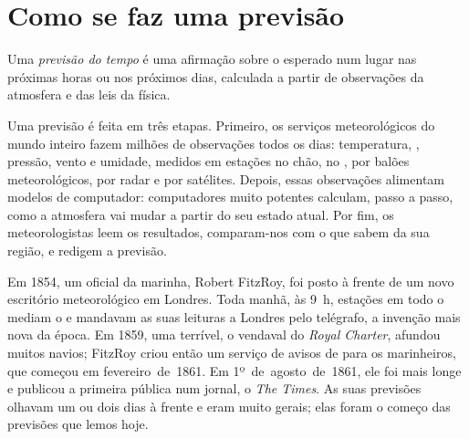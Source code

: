 \section{Como se faz uma previsão}

\begin{definition}\label{def:g8:fronts-and-weather-maps:forecast}
Uma \emph{previsão do tempo} é uma afirmação sobre o
 esperado num lugar nas próximas horas ou nos próximos dias,
calculada a partir de observações da atmosfera e das leis da física.
\end{definition}

Uma previsão é feita em três etapas. Primeiro, os serviços meteorológicos
do mundo inteiro fazem milhões de observações todos os dias: temperatura,
, pressão, vento e umidade, medidos em estações no chão, no , por
balões meteorológicos, por radar e por satélites. Depois, essas
observações alimentam modelos de computador: computadores muito potentes
calculam, passo a passo, como a atmosfera vai mudar a partir do seu
estado atual. Por fim, os meteorologistas leem os resultados, comparam-nos
com o que sabem da sua região, e redigem a previsão.

\begin{history}
Em 1854, um oficial da marinha, Robert FitzRoy, foi posto à frente de um
novo escritório meteorológico em Londres. Toda manhã, às 9~h, estações em
todo o  mediam o  e mandavam as suas leituras a Londres pelo
telégrafo, a invenção mais nova da época. Em 1859, uma 
terrível, o vendaval do \emph{Royal Charter}, afundou muitos navios;
FitzRoy criou então um serviço de avisos de  para os
marinheiros, que começou em fevereiro~de~1861. Em 1º~de~agosto~de~1861,
ele foi mais longe e publicou a primeira  pública num
jornal, o \emph{The Times}. As suas previsões olhavam um ou dois dias à
frente e eram muito gerais; elas foram o começo das previsões que lemos
hoje.
\end{history}


